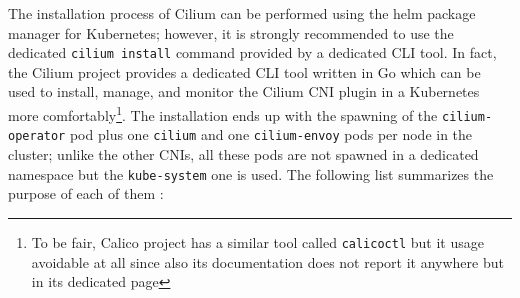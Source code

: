 The installation process of Cilium can be performed using the helm package
manager for Kubernetes; however, it is strongly recommended to use the dedicated
\texttt{cilium install} command provided by a dedicated CLI tool.
In fact, the Cilium project provides a dedicated CLI tool written in Go which
can be used to install, manage, and monitor the Cilium CNI plugin in a
Kubernetes more comfortably\footnote{To be fair, Calico project has a similar
  tool called \texttt{calicoctl} but it usage avoidable at all since also its
  documentation does not report it anywhere but in its dedicated page}.
The installation ends up with the spawning of the \texttt{cilium-operator} pod
plus one \texttt{cilium} and one \texttt{cilium-envoy} pods per node in the
cluster; unlike the other CNIs, all these pods are not spawned in a dedicated
namespace but the \texttt{kube-system} one is used. The following list
summarizes the purpose of each of them \cite{ciliumdoc-components,
  ciliumdoc-envoy}:
